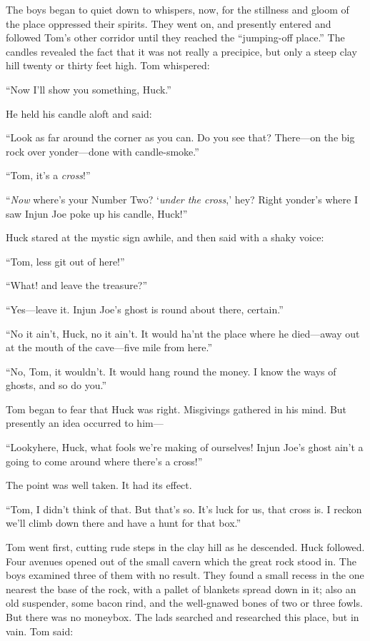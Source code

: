 \documentclass{book}
\begin{document}
The boys began to quiet down to whispers, now, for the stillness and gloom of the place oppressed their spirits. They went on, and presently entered and followed Tom’s other corridor until they reached the “jumping-off place.” The candles revealed the fact that it was not really a precipice, but only a steep clay hill twenty or thirty feet high. Tom whispered:

“Now I’ll show you something, Huck.”

He held his candle aloft and said:

“Look as far around the corner as you can. Do you see that? There—on the big rock over yonder—done with candle-smoke.”

“Tom, it’s a \emph{cross}!”

“\emph{Now} where’s your Number Two? ‘\emph{under the cross},’ hey? Right yonder’s where I saw Injun Joe poke up his candle, Huck!”

Huck stared at the mystic sign awhile, and then said with a shaky voice:

“Tom, less git out of here!”

“What! and leave the treasure?”

“Yes—leave it. Injun Joe’s ghost is round about there, certain.”

“No it ain’t, Huck, no it ain’t. It would ha’nt the place where he died—away out at the mouth of the cave—five mile from here.”

“No, Tom, it wouldn’t. It would hang round the money. I know the ways of ghosts, and so do you.”

Tom began to fear that Huck was right. Misgivings gathered in his mind. But presently an idea occurred to him—

“Lookyhere, Huck, what fools we’re making of ourselves! Injun Joe’s ghost ain’t a going to come around where there’s a cross!”

The point was well taken. It had its effect.

“Tom, I didn’t think of that. But that’s so. It’s luck for us, that cross is. I reckon we’ll climb down there and have a hunt for that box.”

Tom went first, cutting rude steps in the clay hill as he descended. Huck followed. Four avenues opened out of the small cavern which the great rock stood in. The boys examined three of them with no result. They found a small recess in the one nearest the base of the rock, with a pallet of blankets spread down in it; also an old suspender, some bacon rind, and the well-gnawed bones of two or three fowls. But there was no moneybox. The lads searched and researched this place, but in vain. Tom said:
\end{document}
